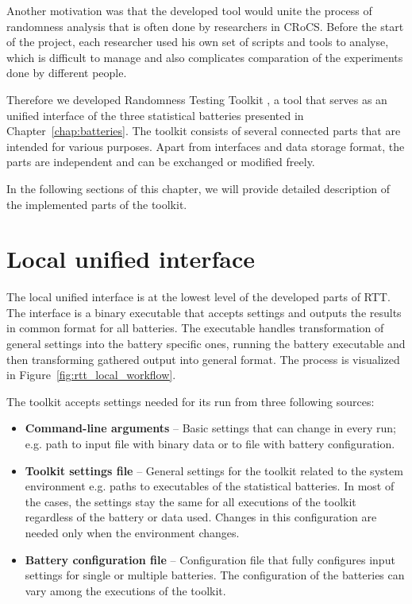 \documentclass[
	digital,    %
	oneside,    %
	color,
	11pt,
	nocover,
	notable,
	nolof,
	nolot,
]{fithesis3}
\theoremstyle{definition}
\theoremstyle{remark}
\begin{document}
Another motivation was that the developed tool would unite the process of randomness analysis that is often done by researchers in CRoCS. Before the start of the project, each researcher used his own set of scripts and tools to analyse, which is difficult to manage and also complicates comparation of the experiments done by different people.

Therefore we developed Randomness Testing Toolkit \cite{rtt-github}, a tool that serves as an unified interface of the three statistical batteries presented in Chapter~\ref{chap:batteries}. The toolkit consists of several connected parts that are intended for various purposes. Apart from interfaces and data storage format, the parts are independent and can be exchanged or modified freely. 

In the following sections of this chapter, we will provide detailed description of the implemented parts of the toolkit.

\section{Local unified interface}
The local unified interface is at the lowest level of the developed parts of RTT. The interface is a binary executable that accepts settings and outputs the results in common format for all batteries. The executable handles transformation of general settings into the battery specific ones, running the battery executable and then transforming gathered output into general format. The process is visualized in Figure~\ref{fig:rtt_local_workflow}.

The toolkit accepts settings needed for its run from three following sources:
\begin{itemize}
\item \textbf{Command-line arguments} -- Basic settings that can change in every run; e.g. path to input file with binary data or to file with battery configuration.
\item \textbf{Toolkit settings file} -- General settings for the toolkit related to the system environment e.g. paths to executables of the statistical batteries. In most of the cases, the settings stay the same for all executions of the toolkit regardless of the battery or data used. Changes in this configuration are needed only when the environment changes.
\item \textbf{Battery configuration file} -- Configuration file that fully configures input settings for single or multiple batteries. The configuration of the batteries can vary among the executions of the toolkit.
\end{itemize}
\end{document}
